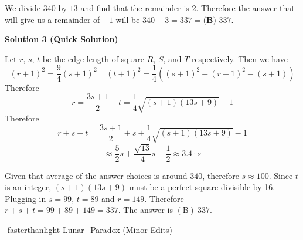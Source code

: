 \begin{enumerate}
 We divide $340$ by $13$ and find that the remainder is $2$. Therefore the answer that will give us a remainder of $-1$ will be $340-3=337=\boxed{\textbf{(B) }337}$.

 



\textbf{Solution 3 (Quick Solution)}

Let $r$, $s$, $t$ be the edge length of square $R$, $S$, and $T$ respectively. Then we have 
 \[(r+1)^2=\dfrac{9}{4}(s+1)^2\ \ \ \ \ (t+1)^2=\dfrac{1}{4}((s+1)^2+(r+1)^2-(s+1))\] Therefore 
 \[r=\dfrac{3s+1}{2}\ \ \ \ \ t=\dfrac{1}{4}\sqrt{(s+1)(13s+9)}-1\] Therefore 
 \[r+s+t=\dfrac{3s+1}{2}+s+\dfrac{1}{4}\sqrt{(s+1)(13s+9)}-1\] 
 \[\approx\dfrac{5}{2}s+\dfrac{\sqrt{13}}{4}s-\dfrac{1}{2}\approx 3.4\cdot s\]

 

 Given that average of the answer choices is around $340$, therefore $s\approx 100$. Since $t$ is an integer, $(s+1)(13s+9)$ must be a perfect square divisible by 16. Plugging in $s=99$, $t=89$ and $r=149$. Therefore $r+s+t=99+89+149=337$. The answer is $\boxed{(\text{B})\ 337}$.

 -fasterthanlight-Lunar\_Paradox (Minor Edits)

 


\end{enumerate}
